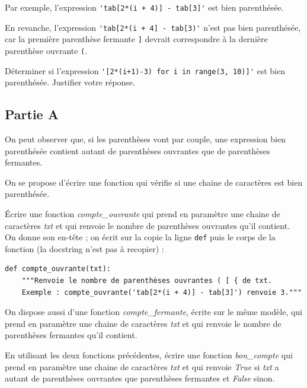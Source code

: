 \documentclass[a4paper, noanswers, addpoints, 12pt]{exam}
\begin{document}
\begin{questions}
Par exemple, l'expression \lstinline|'tab[2*(i + 4)] - tab[3]'| est bien parenthésée.

En revanche, l'expression \lstinline|'tab[2*(i + 4] - tab[3)'| n'est pas bien parenthésée, car la première parenthèse fermante \texttt{]} devrait correspondre à la dernière parenthèse ouvrante \texttt{(}.

\question[1\half] Déterminer si l'expression \lstinline|'[2*(i+1)-3) for i in range(3, 10)]'| est bien parenthésée. Justifier votre réponse.

\subsection*{Partie A}
On peut observer que, si les parenthèses vont par couple, une expression bien parenthésée contient autant de parenthèses ouvrantes que de parenthèses fermantes.

On se propose d'écrire une fonction qui vérifie si une chaine de caractères est bien parenthésée.

\question[1\half] Écrire une fonction \textit{compte\_ouvrante} qui prend en paramètre une chaine de caractères \textit{txt} et qui renvoie le nombre de parenthèses ouvrantes qu'il contient. On donne son en-tête ; on écrit sur la copie la ligne \texttt{def} puis le corps de la fonction (la docstring n'est pas à recopier) :
\par\noindent\begin{minipage}{\linewidth}
\begin{lstlisting}[style=entete]
def compte_ouvrante(txt):
    """Renvoie le nombre de parenthèses ouvrantes ( [ { de txt.
    Exemple : compte_ouvrante('tab[2*(i + 4)] - tab[3]') renvoie 3."""
\end{lstlisting}
\end{minipage}\par

On dispose aussi d'une fonction \textit{compte\_fermante}, écrite sur le même modèle, qui prend en paramètre une chaine de caractères \textit{txt} et qui renvoie le nombre de parenthèses fermantes qu'il contient.

\question[1] En utilisant les deux fonctions précédentes, écrire une fonction \textit{bon\_compte} qui prend en paramètre une chaine de caractères \textit{txt} et qui renvoie \textit{True} si \textit{txt} a autant de parenthèses ouvrantes que parenthèses fermantes et \textit{False} sinon.


\end{questions}
\end{document}
